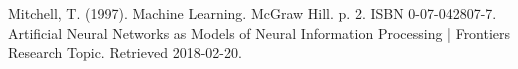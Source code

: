 \documentclass{article}
\begin{document}
\begin{spacing}{2.0}
\begin{thebibliography}{10}
Mitchell, T. (1997). Machine Learning. McGraw Hill. p. 2. ISBN 0-07-042807-7. 
Artificial Neural Networks as Models of Neural Information Processing | Frontiers Research Topic. Retrieved 2018-02-20. 
\end{thebibliography}

\end{spacing}
\end{document}
